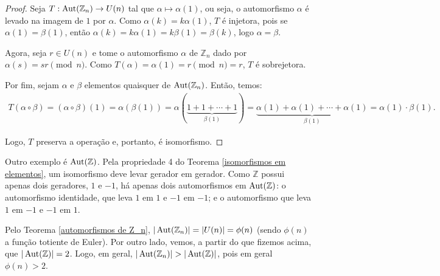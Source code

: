 	\begin{proof}
		Seja $T: \operatorname{Aut}(\mathbb{Z}_n)\to U(n)$ tal que $\alpha\mapsto\alpha(1)$,
		ou seja, o automorfismo $\alpha$ é levado na imagem de $1$ por
		$\alpha$. Como $\alpha(k) = k\alpha(1)$, $T$ é injetora, pois se 
		$\alpha(1) = \beta(1)$, então 
		$\alpha(k) = k\alpha(1) = k\beta(1) = \beta(k)$, logo 
		$\alpha = \beta$.
		\par\vspace{0.3cm} Agora, seja $r\in U(n)$ e tome o automorfismo
		$\alpha$ de $\mathbb{Z}_n$ dado por $\alpha(s) = sr \pmod n$. 
		Como $T(\alpha) = \alpha(1) = r\pmod n = r$, $T$ é sobrejetora.
		\par\vspace{0.3cm} Por fim, sejam $\alpha$ e $\beta$ elementos
		quaisquer de $\operatorname{Aut}(\mathbb{Z}_n)$. Então, temos:
		\begin{align*}
            T(\alpha\circ\beta) = (\alpha\circ\beta)(1) = \alpha(\beta(1)) 
            = \alpha(\underbrace{1 + 1 + \cdots + 1}_{\beta(1)}) 
            = \underbrace{\alpha(1) + \alpha(1) + \cdots +
            \alpha(1)}_{\beta(1)} 
            = \alpha(1)\cdot\beta(1).
		\end{align*}
		\par\vspace{0.3cm} Logo, $T$ preserva a operação e, portanto, 
		é isomorfismo.
	\end{proof}
	\par\vspace{0.3cm} Outro exemplo é $\operatorname{Aut}(\mathbb{Z})$.	
	Pela propriedade 4 do Teorema \ref{isomorfismos em elementos}, 
	um isomorfismo deve levar gerador em gerador. Como $\mathbb{Z}$ 
	possui apenas dois geradores, $1$ e $-1$, há apenas dois 
	automorfismos em $\operatorname{Aut}(\mathbb{Z})$: o automorfismo identidade, 
	que leva $1$ em $1$ e $-1$ em $-1$; e o automorfismo que leva 
	$1$ em $-1$ e $-1$ em $1$.
	\begin{remark}
		Pelo Teorema \ref{automorfismos de Z_n}, 
		$|\operatorname{Aut}(\mathbb{Z}_n)| = |U(n)| = \phi(n)$ (sendo $\phi(n)$ a 
		função totiente de Euler). Por outro lado, vemos, a partir do que
		fizemos acima, que $|\operatorname{Aut}(\mathbb{Z})| = 2$. Logo, em geral,
		$|\operatorname{Aut}(\mathbb{Z}_n)| > |\operatorname{Aut}(\mathbb{Z})|$, pois em geral 
		$\phi(n) > 2$.
	\end{remark}
